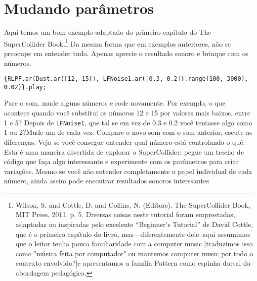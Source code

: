\section{Mudando parâmetros}

Aqui temos um bom exemplo adaptado do primeiro capítulo do The SuperCollider Book.\footnote{
Wilson, S. and Cottle, D. and Collins, N. (Editors). The SuperCollider Book, MIT Press, 2011, p. 5. Diversas coisas neste tutorial foram emprestadas, adaptadas ou inspiradas pelo excelente “Beginner’s Tutorial” de David Cottle, que é o primeiro capítulo do livro, mas---diferentemente dele--aqui assumimos que o leitor tenha pouca familiaridade com a computer music [traduzimos isso como "música feita por computador" ou mantemos computer music por todo o contexto envolvido?]e apresentamos a família Pattern como espinha dorsal da abordagem pedagógica.
} Da mesma forma que em exemplos anteriores, não se preocupe em entender tudo. Apenas aprecie o resultado sonoro e brinque com os números.

\begin{lstlisting}[style=SuperCollider-IDE, basicstyle=\scttfamily\footnotesize]
{RLPF.ar(Dust.ar([12, 15]), LFNoise1.ar([0.3, 0.2]).range(100, 3000), 0.02)}.play;
\end{lstlisting}

Pare o som, mude alguns números e rode novamente. Por exemplo, o que acontece quando você substitui os números 12 e 15 por valores mais baixos, entre 1 e 5? Depois de \texttt{LFNoise1}, que tal se em vez de 0.3 e 0.2 você tentasse algo como 1 ou 2?Mude um de cada vez. Compare o novo som com o som anterior, escute as diferenças. Veja se você consegue entender qual número está controlando o quê. Esta é uma maneira divertida de explorar o SuperCollider: pegue um trecho de código que faça algo interessante e experimente com os parâmetros para criar variações. Mesmo se você não entender completamente o papel individual de cada número, ainda assim pode encontrar resultados sonoros interssantes

\bigskip 
{}
